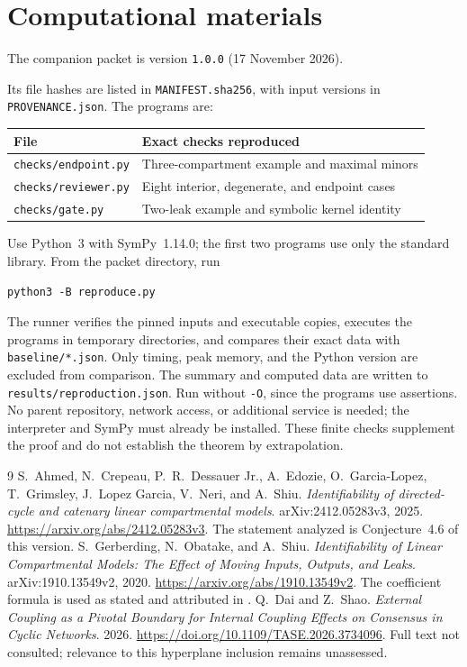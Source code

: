 \documentclass[11pt]{article}
\begin{document}
\section{Computational materials}
The companion packet is version \texttt{1.0.0} (17 November 2026).\par
Its file hashes are listed in \texttt{MANIFEST.sha256}, with input versions
in \texttt{PROVENANCE.json}. The programs are:
\begin{center}
\begin{tabular}{ll}
\toprule
File & Exact checks reproduced\\
\midrule
\texttt{checks/endpoint.py} & Three-compartment example and maximal minors\\
\texttt{checks/reviewer.py} & Eight interior, degenerate, and endpoint cases\\
\texttt{checks/gate.py} & Two-leak example and symbolic kernel identity\\
\bottomrule
\end{tabular}
\end{center}
Use Python~3 with SymPy~1.14.0; the first two programs use only the
standard library. From the packet directory, run
\begin{verbatim}
python3 -B reproduce.py
\end{verbatim}
The runner verifies the pinned inputs and executable copies, executes
the programs in temporary directories, and compares their exact data
with \texttt{baseline/*.json}. Only timing, peak memory, and the Python
version are excluded from comparison. The summary and computed data
are written to \texttt{results/reproduction.json}. Run without
\texttt{-O}, since the programs use assertions. No parent repository,
network access, or additional service is needed; the interpreter and
SymPy must already be installed. These finite checks supplement the
proof and do not establish the theorem by extrapolation.

\begin{thebibliography}{9}
S.~Ahmed, N.~Crepeau, P.~R.~Dessauer Jr., A.~Edozie, O.~Garcia-Lopez,
T.~Grimsley, J.~Lopez Garcia, V.~Neri, and A.~Shiu.
\emph{Identifiability of directed-cycle and catenary linear compartmental models}.
arXiv:2412.05283v3, 2025.
\url{https://arxiv.org/abs/2412.05283v3}.
The statement analyzed is Conjecture~4.6 of this version.
S.~Gerberding, N.~Obatake, and A.~Shiu.
\emph{Identifiability of Linear Compartmental Models: The Effect of Moving Inputs, Outputs, and Leaks}.
arXiv:1910.13549v2, 2020.
\url{https://arxiv.org/abs/1910.13549v2}.
The coefficient formula is used as stated and attributed in \cite[Lemma~3.10]{Ahmed}.
Q.~Dai and Z.~Shao.
\emph{External Coupling as a Pivotal Boundary for Internal Coupling Effects on Consensus in Cyclic Networks}.
2026. \url{https://doi.org/10.1109/TASE.2026.3734096}.
Full text not consulted; relevance to this hyperplane inclusion remains unassessed.
\end{thebibliography}
\end{document}
